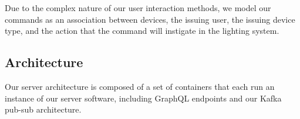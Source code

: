 \documentclass[10pt,twocolumn,letterpaper]{article}
\begin{document}
Due to the complex nature of our user interaction methods, we model our commands
as an association between devices, the issuing user, the issuing device type,
and the action that the command will instigate in the lighting system.

\subsection{Architecture}
Our server architecture is composed of a set of containers that each run an
instance of our server software, including GraphQL endpoints and our Kafka
pub-sub architecture.
\end{document}
